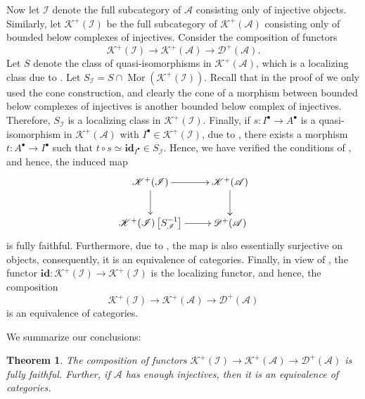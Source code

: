 \documentclass[11pt]{article}
\theoremstyle{thmstyle}
\newtheorem{theorem}{Theorem}[section]
\theoremstyle{defstyle}
\newcommand{\id}{\mathbf{id}}
\newcommand{\scrA}{\mathscr{A}}
\newcommand{\scrD}{\mathscr{D}}
\newcommand{\scrK}{\mathscr{K}}
\newcommand{\scrI}{\mathscr{I}}
\newcommand{\Mor}{\operatorname{Mor}}
\begin{document}
Now let $\scrI$ denote the full subcategory of $\scrA$ consisting only of injective objects. Similarly, let $\scrK^+(\scrI)$ be the full subcategory of $\scrK^+(\scrA)$ consisting only of bounded below complexes of injectives. Consider the composition of functors 
\begin{equation*}
	\scrK^+(\scrI)\longrightarrow\scrK^+(\scrA)\longrightarrow\scrD^+(\scrA).
\end{equation*}
Let $S$ denote the class of quasi-isomorphisms in $\scrK^+(\scrA)$, which is a localizing class due to . Let $S_{\scrI} = S\cap\Mor\left(\scrK^+(\scrI)\right)$. Recall that in the proof of  we only used the cone construction, and clearly the cone of a morphism between bounded below complexes of injectives is another bounded below complex of injectives. Therefore, $S_{\scrI}$ is a localizing class in $\scrK^+(\scrI)$. Finally, if $s\colon I^\bullet\to A^\bullet$ is a quasi-isomorphism in $\scrK^+(\scrA)$ with $I^\bullet\in\scrK^+(\scrI)$, due to , there exists a morphism $t\colon A^\bullet\to I^\bullet$ such that $t\circ s\simeq \id_{I^\bullet}\in S_{\scrI}$. Hence, we have verified the conditions of , and hence, the induced map 
\begin{equation*}
	\xymatrix {
		\scrK^+(\scrI)\ar[r]\ar[d] & \scrK^+(\scrA)\ar[d]\\
		\scrK^+(\scrI)\left[S_\scrI^{-1}\right]\ar[r] & \scrD^+(\scrA)
	}
\end{equation*}
is fully faithful. Furthermore, due to , the map is also essentially surjective on objects, consequently, it is an equivalence of categories. Finally, in view of , the functor $\id\colon\scrK^+(\scrI)\to\scrK^+(\scrI)$ is the localizing functor, and hence, the composition 
\begin{equation*}
	\scrK^+(\scrI)\to \scrK^+(\scrA)\to\scrD^+(\scrA)
\end{equation*}
is an equivalence of categories.

We summarize our conclusions: 
\begin{theorem}
	The composition of functors $\scrK^+(\scrI)\to\scrK^+(\scrA)\to\scrD^+(\scrA)$ is fully faithful. Further, if $\scrA$ has enough injectives, then it is an equivalence of categories.
\end{theorem}
\end{document}
